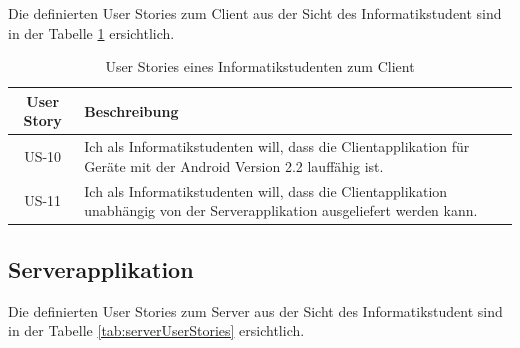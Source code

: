 \documentclass[abstracton, listof=totocnumbered,
bibliography=totocnumbered]{scrreprt}
\begin{document}
  Die definierten User Stories zum Client aus der Sicht des Informatikstudent
  sind in der Tabelle \ref{tab:clientUserStories} ersichtlich.
  \newline
  
  \begin{table}[h]
    \begin{center}
      \begin{tabular}{cp{13cm}l}
        \toprule
        User Story & Beschreibung \\
        \midrule
        US-10 & Ich als Informatikstudenten will, dass die Clientapplikation für
        Geräte mit der Android Version 2.2 lauffähig ist. \\
        US-11 & Ich als Informatikstudenten will, dass die Clientapplikation
        unabhängig von der Serverapplikation ausgeliefert werden kann. \\
        \bottomrule
      \end{tabular}
      \caption{User Stories eines Informatikstudenten zum Client}
      \label{tab:clientUserStories}
    \end{center}  
  \end{table}
  
  \subsection{Serverapplikation}
  
  Die definierten User Stories zum Server aus der Sicht des Informatikstudent
  sind in der Tabelle \ref{tab:serverUserStories} ersichtlich.
  \newline
  
\end{document}
